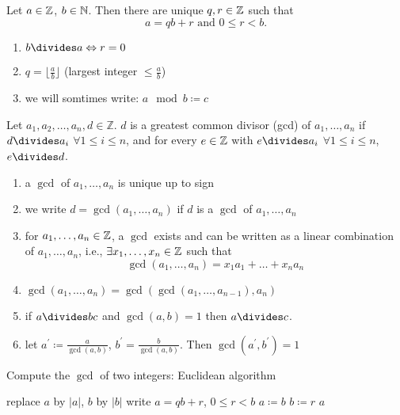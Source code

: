 \documentclass[NumTh.tex]{subfiles}
\begin{document}
\begin{defi}[Remainder]
Let $a \in \mathbb{Z}$, $b \in \mathbb{N}$. Then there are unique $q,r \in \mathbb{Z}$ such that
\[a = qb + r \text{ and } 0 \leq r < b.\]
\end{defi}

\begin{rem}
\begin{enumerate}
  \item $b\divides a \Leftrightarrow r = 0$
  \item $q = \lfloor \frac{a}{b} \rfloor$ (largest integer $\leq \frac{a}{b}$)
  \item we will somtimes write: $a \mod b \coloneq c$
\end{enumerate}
\end{rem}

\begin{defi}
Let $a_1,a_2,\dots,a_n,d \in \mathbb{Z}$. $d$ is a greatest common divisor (gcd) of $a_1,\dots,a_n$ if
$d\divides a_i$ $\forall 1\leq i \leq n$,
and for every $e \in \mathbb{Z}$ with $e\divides a_i$ $\forall 1\leq i \leq n$, $e\divides d$.
\end{defi}

\begin{rem}

\begin{enumerate}
  \item a $\gcd$ of $a_1,\dots,a_n$ is unique up to sign
  \item we write $d = \gcd(a_1,\dots,a_n)$ if $d$ is a $\gcd$ of $a_1,\dots,a_n$
  \item for $a_1,\dots,a_n \in \mathbb{Z}$, a $\gcd$ exists and can be written as a linear combination of $a_1,\dots,a_n$,
  i.e., $\exists x_1,\dots,x_n \in \mathbb{Z}$ such that $$\gcd(a_1,\dots,a_n) = x_1 a_1+ \dots + x_n a_n$$
  \item $\gcd(a_1,\dots,a_n) = \gcd(\gcd(a_1,\dots,a_{n-1}),a_n)$
  \item if $a\divides bc$ and $\gcd(a,b) = 1$ then $a\divides c$.
  \item let $a^\prime \coloneq \frac{a}{\gcd(a,b)}$, $b^\prime = \frac{b}{\gcd(a,b)}$. Then $\gcd(a^\prime,b^\prime) = 1$
\end{enumerate}
\end{rem}

\begin{algorithm}
  \caption{Compute the $\gcd$ of two integers: Euclidean algorithm}
  \begin{algorithmic}
    \State replace $a$ by $|a|$, $b$ by $|b|$
      \State write $a = qb +r$, $0 \leq r < b$
      \State $a \coloneq b$
      \State $b \coloneq r$
    \EndWhile
    \State \Return $a$
  \end{algorithmic}
\end{algorithm}
\end{document}
